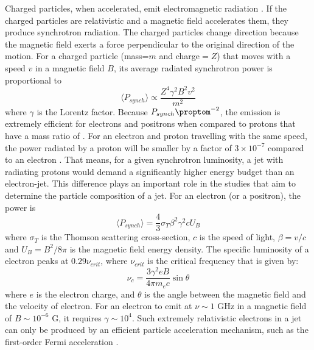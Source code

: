  Charged particles, when accelerated, emit electromagnetic radiation  \cite[for a review, see][]{longair_2011}. If the charged particles are relativistic and a magnetic field accelerates them, they produce synchrotron radiation. The charged particles change direction because the magnetic field exerts a force perpendicular to the original direction of the motion.  For a charged particle (mass=$m$ and charge$=Z$) that moves with a speed $v$ in a magnetic field $B$, its average radiated synchrotron power is proportional to 
\begin{equation}
    \langle  P_{synch} \rangle\propto \frac{Z^4\gamma^2B^2v^2}{m^2}
\end{equation}
 where $\gamma$ is the Lorentz factor.  Because $P_{synch}\proptom^{-2}$, the emission is extremely efficient for electrons and positrons when compared to protons that have a mass ratio of . For an electron and proton travelling with the same speed, the power radiated by a proton will be smaller by a factor of $3\times10^{-7}$ compared to an electron
 . That means, for a given synchrotron luminosity, a jet with radiating protons would demand a significantly higher energy budget than an electron-jet. This difference plays an important role in the studies that aim to determine the particle composition of a jet. For an electron (or a positron), the power is
\begin{equation}\label{eq:synch_pow}
    \langle  P_{synch} \rangle=\frac{4}{3}\sigma_T\beta^2\gamma^2cU_B
\end{equation}
where $\sigma_T$ is the Thomson scattering cross-section, $c$ is the speed of light, $\beta=v/c$ and $U_B=B^2/8\pi$ is the magnetic field energy density. The specific luminosity of a electron peaks at $0.29\nu_{crit}$, where $\nu_{crit}$ is the critical frequency that is given by:
\begin{equation}
    \nu_c = \frac{3\gamma^2eB}{4\pi m_e c}\sin{\theta}
\end{equation}
where $e$ is the electron charge, and $\theta$ is the angle between the magnetic field and the velocity of electron. For an electron to emit at $\nu\sim1$ GHz in a magnetic field of $B\sim10^{-6}$ G, it requires $\gamma\sim10^{4}$. Such extremely relativistic electrons in a jet can only be produced by an efficient particle acceleration mechanism, such as the first-order Fermi acceleration \citep{1949PhRv...75.1169F}.

